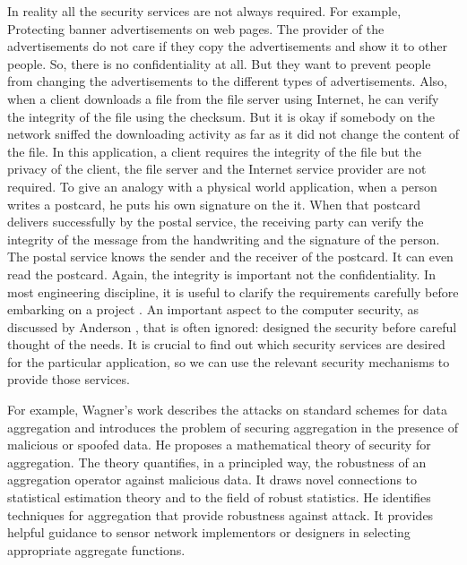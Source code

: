 	In reality all the security services are not always required.
	For example, Protecting banner advertisements on web pages. 
	The provider of the advertisements do not care if they copy the advertisements and show it to other people.
	So, there is no confidentiality at all.
	But they want to prevent people from changing the advertisements to the different types of advertisements.
	Also, when a client downloads a file from the file server using Internet, he can verify the integrity of the file using the checksum.
	But it is okay if somebody on the network sniffed the downloading activity as far as it did not change the content of the file.
	In this application, a client requires the integrity of the file but the privacy of the client, the file server and the Internet service provider are not required.
	To give an analogy with a physical world application, when a person writes a postcard, he puts his own signature on the it. 
	When that postcard delivers successfully by the postal service, the receiving party can verify the integrity of the message from the handwriting and the signature of the person.
	The postal service knows the sender and the receiver of the postcard.
	It can even read the postcard.
	Again, the integrity is important not the confidentiality.
	In most engineering discipline, it is useful to clarify the requirements carefully before embarking on a project \cite{2002-Stajano-ubiquitous}.
	An important aspect to the computer security, as discussed by Anderson \cite{anderson1993cryptosystems}, that is often ignored: designed the security before careful thought of the needs.
 	It is crucial to find out which security services are desired for the particular application, so we can use the relevant security mechanisms to provide those services.
	

	For example, Wagner's work \cite{wagner2004resilient} describes the attacks on standard schemes for data aggregation and introduces the problem of securing aggregation in the presence of malicious or spoofed data.
	He proposes a mathematical theory of security for aggregation.
	The theory quantifies, in a principled way, the robustness of an aggregation operator against malicious data.
	It draws novel connections to statistical estimation theory and to the field of robust statistics.
	He identifies techniques for aggregation that provide robustness against attack. 
	It provides helpful guidance to sensor network implementors or designers in selecting appropriate aggregate functions.

